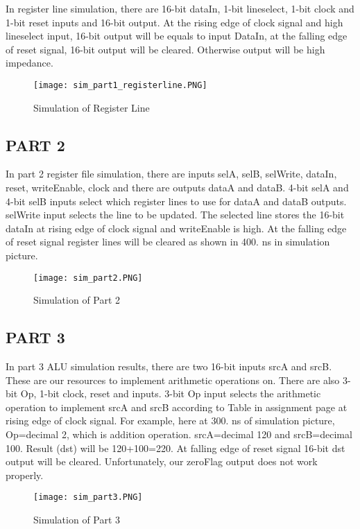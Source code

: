 \documentclass[pdftex,12pt,a4paper]{article}
\begin{document}
In register line simulation, there are 16-bit dataIn, 1-bit lineselect, 1-bit clock and 1-bit reset inputs and 16-bit output. At the rising edge of clock signal and high lineselect input, 16-bit output will be equals to input DataIn, at the falling edge of reset signal, 16-bit output will be cleared. Otherwise output will be high impedance.
\begin{figure}[ht]
	\centering
	\texttt{[image: sim\_part1\_registerline.PNG]}	
	\caption{Simulation of Register Line}
	\label{fig1}
\end{figure}
\clearpage
\subsection{PART 2}
In part 2 register file simulation, there are inputs selA, selB, selWrite, dataIn, reset, writeEnable, clock and there are outputs dataA and dataB. 4-bit selA and 4-bit selB inputs select which register lines to use for dataA and dataB outputs. selWrite input selects the line to be updated. The selected line stores the 16-bit dataIn at rising edge of clock signal and writeEnable is high. At the falling edge of reset signal register lines will be cleared as shown in 400. ns in simulation picture.
\begin{figure}[ht]
	\centering
	\texttt{[image: sim\_part2.PNG]}	
	\caption{Simulation of Part 2}
	\label{fig1}
\end{figure}


\subsection{PART 3}
In part 3 ALU simulation results, there are two 16-bit inputs srcA and srcB. These are our resources to implement arithmetic operations on. There are also 3-bit Op, 1-bit clock, reset and inputs. 3-bit Op input selects the arithmetic operation to implement srcA and srcB according to Table in assignment page at rising edge of clock signal.  For example, here at 300. ns of simulation picture, Op=decimal 2, which is addition operation. srcA=decimal 120 and srcB=decimal 100. Result (dst) will be 120+100=220. At falling edge of reset signal 16-bit dst output will be cleared. Unfortunately, our zeroFlag output does not work properly.
\begin{figure}[ht]
	\centering
	\texttt{[image: sim\_part3.PNG]}	
	\caption{Simulation of Part 3}
	\label{fig1}
\end{figure}
\end{document}
